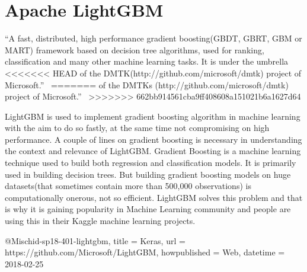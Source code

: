 \section{Apache LightGBM} 

“A fast, distributed, high performance gradient boosting(GBDT, GBRT, GBM or
MART) framework based on decision tree algorithms, used for ranking,
classification and many other machine learning tasks. It is under the umbrella
<<<<<<< HEAD
of the DMTK(http://github.com/microsoft/dmtk) project of Microsoft.”~\cite{hid-sp18-401-lightgbm} 
=======
of the DMTKs (http://github.com/microsoft/dmtk) project of Microsoft.”~\cite{hid-
sp18-401-lightgbm} 
>>>>>>> 662bb914561cba9ff408608a151021b6a1627d64

LightGBM is used to implement gradient boosting algorithm in
machine learning with the aim to do so fastly, at the same time not compromising
on high performance.  A couple of lines on gradient boosting is necessary in
understanding the context and relevance of LightGBM. Gradient Boosting is a
machine learning technique used to build both regression and classification
models. It is primarily used in building decision trees. But building gradient
boosting models on huge datasets(that sometimes contain more than 500,000
observations) is computationally onerous, not so efficient.  LightGBM solves
this problem and that is why it is gaining popularity in Machine Learning
community and people are using this in their Kaggle machine learning projects.

@Misc{hid-sp18-401-lightgbm, 
title = {Keras}, 
url = {https://github.com/Microsoft/LightGBM}, 
howpublished = {Web}, 
datetime = {2018-02-25} }


